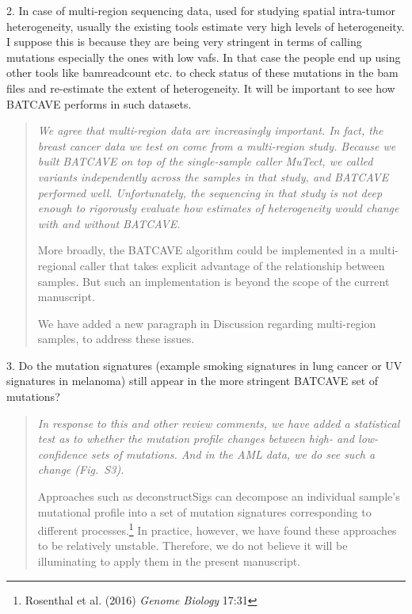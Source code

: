 \documentclass[11pt]{article}
\newenvironment{response}
{\begin{quote}\itshape}
{\end{quote}}
\begin{document}
2. In case of multi-region sequencing data, used for studying spatial intra-tumor heterogeneity, usually the existing tools estimate very high levels of heterogeneity. I suppose this is because they are being very stringent in terms of calling mutations especially the ones with low vafs. In that case the people end up using other tools like bamreadcount etc. to check status of these mutations in the bam files and re-estimate the extent of heterogeneity. It will be important to see how BATCAVE performs in such datasets.
\begin{response}
We agree that multi-region data are increasingly important.
In fact, the breast cancer data we test on come from a multi-region study. 
Because we built BATCAVE on top of the single-sample caller MuTect, we called variants independently across the samples in that study, and BATCAVE performed well.
Unfortunately, the sequencing in that study is not deep enough to rigorously evaluate how estimates of heterogeneity would change with and without BATCAVE.

More broadly, the BATCAVE algorithm could be implemented in a multi-regional caller that takes explicit advantage of the relationship between samples.
But such an implementation is beyond the scope of the current manuscript.

We have added a new paragraph in Discussion regarding multi-region samples, to address these issues.
\end{response}

3. Do the mutation signatures (example smoking signatures in lung cancer or UV signatures in melanoma) still appear in the more stringent BATCAVE set of mutations?
\begin{response}
In response to this and other review comments, we have added a statistical test as to whether the mutation profile changes between high- and low-confidence sets of mutations.
And in the AML data, we do see such a change (Fig.~S3).

Approaches such as deconstructSigs can decompose an individual sample's mutational profile into a set of mutation signatures corresponding to different processes.\footnote{Rosenthal et al. (2016) \emph{Genome Biology} 17:31}
In practice, however, we have found these approaches to be relatively unstable.
Therefore, we do not believe it will be illuminating to apply them in the present manuscript.
\end{response}
\end{document}
